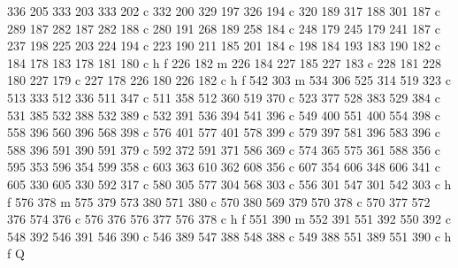 {{        336 205 333 203 333 202 c
        332 200 329 197 326 194 c
        320 189 317 188 301 187 c
        289 187 282 187 282 188 c
        280 191 268 189 258 184 c
        248 179 245 179 241 187 c
        237 198 225 203 224 194 c
        223 190 211 185 201 184 c
        198 184 193 183 190 182 c
        184 178 183 178 181 180 c
        h f
        226 182 m
        226 184 227 185 227 183 c
        228 181 228 180 227 179 c
        227 178 226 180 226 182 c
        h f
        542 303 m
        534 306 525 314 519 323 c
        513 333 512 336 511 347 c
        511 358 512 360 519 370 c
        523 377 528 383 529 384 c
        531 385 532 388 532 389 c
        532 391 536 394 541 396 c
        549 400 551 400 554 398 c
        558 396 560 396 568 398 c
        576 401 577 401 578 399 c
        579 397 581 396 583 396 c
        588 396 591 390 591 379 c
        592 372 591 371 586 369 c
        574 365 575 361 588 356 c
        595 353 596 354 599 358 c
        603 363 610 362 608 356 c
        607 354 606 348 606 341 c
        605 330 605 330 592 317 c
        580 305 577 304 568 303 c
        556 301 547 301 542 303 c
        h f
        576 378 m
        575 379 573 380 571 380 c
        570 380 569 379 570 378 c
        570 377 572 376 574 376 c
        576 376 576 377 576 378 c
        h f
        551 390 m
        552 391 551 392 550 392 c
        548 392 546 391 546 390 c
        546 389 547 388 548 388 c
        549 388 551 389 551 390 c
        h f
        Q
    }}

